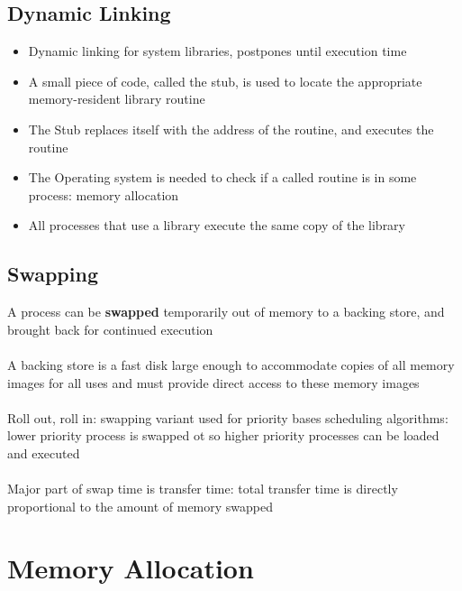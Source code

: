 \documentclass{article}[18pt]
\begin{document}
\subsection{Dynamic Linking}
\begin{itemize}
	\item Dynamic linking for system libraries, postpones until execution time
	\item A small piece of code, called the stub, is used to locate the appropriate memory-resident library routine
	\item The Stub replaces itself with the address of the routine, and executes the routine
	\item The Operating system is needed to check if a called routine is in some process: memory allocation
	\item All processes that use a library execute the same copy of the library
\end{itemize}

\subsection{Swapping}
A process can be \textbf{swapped} temporarily out of memory to a backing store, and brought back for continued execution\\
\\
A backing store is a fast disk large enough to accommodate copies of all memory images for all uses and must provide direct access to these memory images\\
\\
Roll out, roll in: swapping variant used for priority bases scheduling algorithms: lower priority process is swapped ot so higher priority processes can be loaded and executed\\\
\\
Major part of swap time is transfer time: total transfer time is directly proportional to the amount of memory swapped
\section{Memory Allocation}
\end{document}
